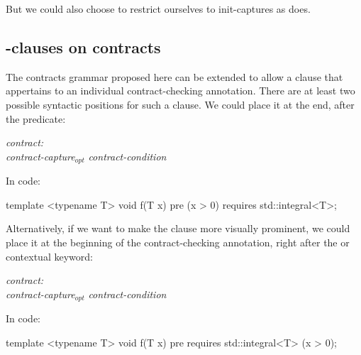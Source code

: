 But we could also choose to restrict ourselves to init-captures as \cite{P2935R0} does. 


\subsection{-clauses on contracts}
\label{subsec:requires}

The contracts grammar proposed here can be extended to allow a  clause that appertains to an individual contract-checking annotation. There are at least two possible syntactic positions for such a  clause. We could place it at the end, after the predicate:

\begin{adjustwidth}{0.5cm}{0.5cm}
\emph{contract:} \\
\phantom{~~~}\emph{contract-capture}$_{opt}$ \emph{contract-condition} 

\end{adjustwidth}

In code:

\vspace{2mm}
\begin{codeblock}
template <typename T>
void f(T x)
  pre (x > 0) requires std::integral<T>;
\end{codeblock}
\vspace{2mm}

Alternatively, if we want to make the  clause more visually prominent, we could place it at the beginning of the contract-checking annotation, right after the  or  contextual keyword:

\begin{adjustwidth}{0.5cm}{0.5cm}

\emph{contract:} \\
\phantom{~~~} \emph{contract-capture}$_{opt}$ \emph{contract-condition}

\end{adjustwidth}

In code:

\vspace{2mm}
\begin{codeblock}
template <typename T>
void f(T x)
  pre requires std::integral<T> (x > 0);
\end{codeblock}
\vspace{2mm}

